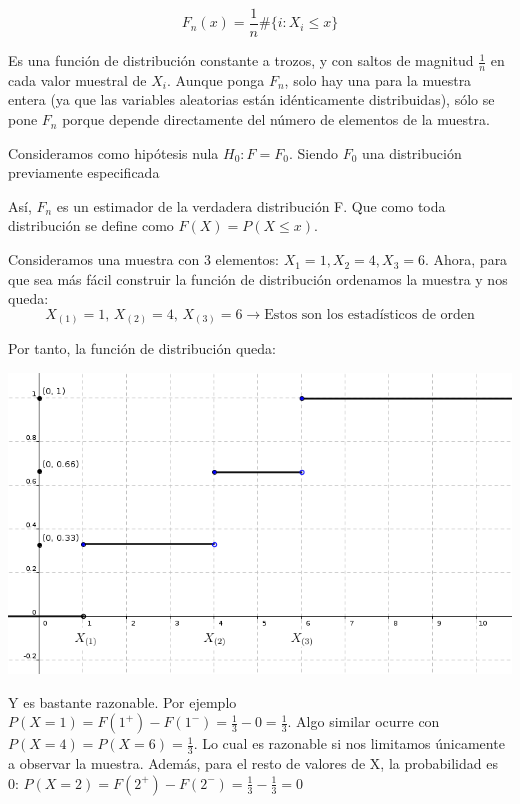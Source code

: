 \documentclass[nochap]{apuntes}
\begin{document}
$$ F_n(x)=\frac{1}{n}\#\{i: X_i \leq x\} $$

Es una función de distribución constante a trozos, y con saltos de magnitud $\frac{1}{n}$ en cada valor muestral de $X_i$. Aunque ponga $F_n$, solo hay una para la muestra entera (ya que las variables aleatorias están idénticamente distribuidas), sólo se pone $F_n$ porque depende directamente del número de elementos de la muestra.

Consideramos como hipótesis nula $H_0: F=F_0$. Siendo $F_0$ una distribución previamente especificada

Así, $F_n$ es un estimador de la verdadera distribución F. Que como toda distribución se define como $F(X)=P(X\leq x)$.

\begin{example}
Consideramos una muestra con 3 elementos: $X_1=1, X_2=4, X_3=6$. Ahora, para que sea más fácil construir la función de distribución ordenamos la muestra y nos queda:
$$ X_{(1)}=1 \text{, }X_{(2)}=4 \text{, }X_{(3)}=6 \rightarrow \text{Estos son los estadísticos de orden}$$

Por tanto, la función de distribución queda:

\includegraphics[scale=0.5]{img/contrasteks.png}

Y es bastante razonable. Por ejemplo $P(X=1) = F(1^+)-F(1^-)=\frac{1}{3}-0=\frac{1}{3}$. Algo similar ocurre con $P(X=4) = P(X=6) = \frac{1}{3}$. Lo cual es razonable si nos limitamos únicamente a observar la muestra. Además, para el resto de valores de X, la probabilidad es 0: $P(X=2)=F(2^+)-F(2^-) = \frac{1}{3}-\frac{1}{3}=0$
\end{example}
\end{document}
